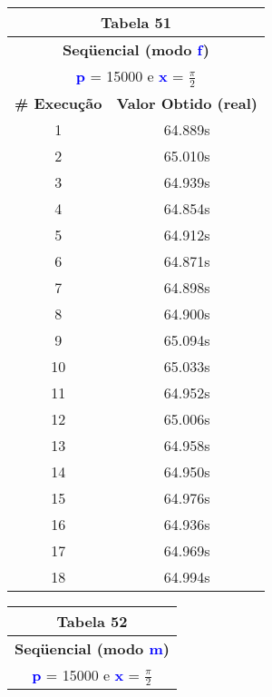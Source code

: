 \documentclass[11pt]{article}
\begin{document}
\begin{table}[!h]
	\begin{center}
		\begin{minipage}{0.48\textwidth}
			\begin{tabular}{| c | c |}
			\hline
			\multicolumn{2}{|c|}{\textbf{Tabela 51}} \\ \hline
			\multicolumn{2}{|c|}{\textbf{Seqüencial (modo \textbf{\textcolor{blue}{f}})}} \\
			\multicolumn{2}{|c|}{\textbf{\textcolor{blue}{p}} = 15000 e \textbf{\textcolor{blue}{x}} = $\frac{\pi}{2}$} \\ [0.2ex]
			\hline
				\textbf{\# Execução} &  \textbf{Valor Obtido (real)} \\ \hline
				1 & 64.889s \\ \hline
				2 & 65.010s \\ \hline
				3 & 64.939s \\ \hline
				4 & 64.854s \\ \hline
				5 & 64.912s \\ \hline
				6 & 64.871s \\ \hline
				7 & 64.898s \\ \hline
				8 & 64.900s \\ \hline
				9 & 65.094s \\ \hline
				10 & 65.033s \\ \hline
				11 & 64.952s \\ \hline
				12 & 65.006s \\ \hline
				13 & 64.958s \\ \hline
				14 & 64.950s \\ \hline
				15 & 64.976s \\ \hline
				16 & 64.936s \\ \hline
				17 & 64.969s \\ \hline
				18 & 64.994s \\ \hline
			\end{tabular}
		\end{minipage}
		\begin{minipage}{0.48\textwidth}
			\begin{tabular}{| c | c |}
			\hline
			\multicolumn{2}{|c|}{\textbf{Tabela 52}} \\ \hline
			\multicolumn{2}{|c|}{\textbf{Seqüencial (modo \textbf{\textcolor{blue}{m}})}} \\
			\multicolumn{2}{|c|}{\textbf{\textcolor{blue}{p}} = 15000 e \textbf{\textcolor{blue}{x}} = $\frac{\pi}{2}$} \\ [0.2ex]

\end{tabular}
\end{minipage}
\end{center}
\end{table}
\end{document}

